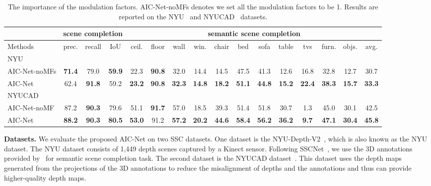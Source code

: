 \begin{table*}[t]
\begin{center}
\scalebox{0.85}
{
\begin{tabular} {l |c c c|c c c c c c c c c c c|c} \hline
 &  \multicolumn{3}{c|}{scene completion} & \multicolumn{12}{c}{semantic scene completion} \\ 
\hline
Methods  & prec. & recall & IoU & \cellcolor{rgb1}ceil. & \cellcolor{rgb2}floor & \cellcolor{rgb3}wall & \cellcolor{rgb4}win. & \cellcolor{rgb5}chair & \cellcolor{rgb6}bed & \cellcolor{rgb7}sofa & \cellcolor{rgb8}table & \cellcolor{rgb9}tvs & \cellcolor{rgb10}furn. & \cellcolor{rgb11}objs. & avg. \\ 
\hline
\hline
NYU  &&&&&&&&&& \\
\hline

AIC-Net-noMFs & {\bfseries71.4} & 79.0 & {\bfseries59.9} & 22.3 & {\bfseries90.8} & 32.0  & 14.4 & 14.5 & 47.5 & 41.3 & 12.6 & 16.8 & 32.8 & 12.7 & 30.7
\\
AIC-Net  &62.4&{\bfseries91.8}&59.2& {\bfseries23.2}& {\bfseries90.8} & {\bfseries32.3} & {\bfseries14.8} & {\bfseries18.2} & {\bfseries51.1} &{\bfseries44.8} &{\bfseries15.2} &{\bfseries22.4} &{\bfseries38.3} &{\bfseries15.7}&{\bfseries33.3} 
\\

\hline
\hline
NYUCAD  &&&&&&&&&& \\
\hline


AIC-Net-noMF & 87.2 & {\bfseries90.3} & 79.6 & 51.1  & {\bfseries91.7}  & 57.0   & 18.5  & 39.3  & 51.4  & 51.8  & 30.7   & 1.3  & 45.0   & 30.1 & 42.5
\\
AIC-Net & {\bfseries88.2} & {\bfseries90.3} & {\bfseries 80.5} & {\bfseries53.0}  & 91.2 & {\bfseries 57.2} & {\bfseries20.2} & {\bfseries 44.6} & {\bfseries58.4} & {\bfseries56.2} & {\bfseries 36.2}  & {\bfseries9.7} & {\bfseries 47.1} & {\bfseries 30.4} & {\bfseries 45.8} 
\\
\hline

\end{tabular}
}  \caption{The importance of the modulation factors. AIC-Net-noMFs denotes we set all the modulation factors to be 1. Results are reported on the NYU~\cite{silberman2012indoor} and NYUCAD~\cite{zheng2013beyond} datasets.}
\vspace{-0.6cm}
\label{tab:ModulationFactor}
\end{center}
\end{table*}
 
\noindent
\textbf{Datasets.}
We evaluate the proposed AIC-Net on two SSC datasets. One dataset is the NYU-Depth-V2~\cite{silberman2012indoor}, which is also known as the NYU dataset. The NYU dataset consists of 1,449 depth scenes captured by a Kinect sensor. Following SSCNet~\cite{song2017_SSCNet}, we use the 3D annotations provided by~\cite{rock2015completing} for semantic scene completion task. 
The second dataset is the NYUCAD dataset~\cite{firman2016NYUCAD}. This dataset uses the depth maps generated from the projections of the 3D annotations to reduce the misalignment of depths and the annotations and thus can provide higher-quality depth maps.


